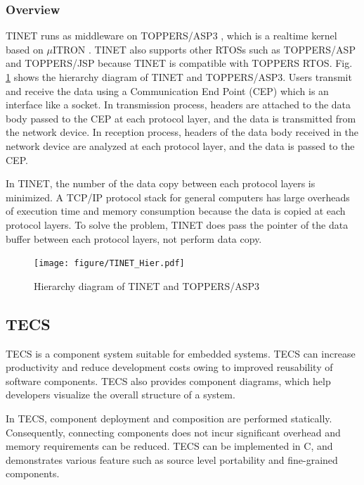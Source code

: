 \documentclass[conference]{IEEEtran/IEEEtran}
\begin{document}
\subsubsection{Overview}

TINET runs as middleware on TOPPERS/ASP3 \cite{url:ASP3}, which is a realtime kernel based on $\mu$ITRON \cite{par:microITRON}.
TINET also supports other RTOSs such as TOPPERS/ASP and TOPPERS/JSP because TINET is compatible with TOPPERS RTOS.
Fig. \ref{fig:TINET_Hier} shows the hierarchy diagram of TINET and TOPPERS/ASP3.
Users transmit and receive the data using a Communication End Point (CEP) which is an interface like a socket.
In transmission process, headers are attached to the data body passed to the CEP at each protocol layer, and the data is transmitted from the network device.
In reception process, headers of the data body received in the network device are analyzed at each protocol layer, and the data is passed to the CEP.

In TINET, the number of the data copy between each protocol layers is minimized.
A TCP/IP protocol stack for general computers has large overheads of execution time and memory consumption because the data is copied at each protocol layers.
To solve the problem, TINET does pass the pointer of the data buffer between each protocol layers, not perform data copy.



\begin{figure}[t]
    \centering
    \texttt{[image: figure/TINET\_Hier.pdf]}
    \caption{Hierarchy diagram of TINET and TOPPERS/ASP3}
    \label{fig:TINET_Hier}
\end{figure}


\subsection{TECS}
\label{sec:TECS}

TECS is a component system suitable for embedded systems.
TECS can increase productivity and reduce development costs owing to improved reusability of software components.
TECS also provides component diagrams, which help developers visualize the overall structure of a system.

In TECS, component deployment and composition are performed statically.
Consequently, connecting components does not incur significant overhead and memory requirements can be reduced.
TECS can be implemented in C, and demonstrates various feature such as source level portability and fine-grained components.
\end{document}
